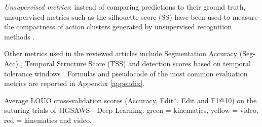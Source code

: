 \documentclass[journal]{IEEEtran}
\begin{document}
\textit{Unsupervised metrics}: instead of comparing predictions to their ground truth, unsupervised metrics such as the silhouette score (SS) have been used to measure the compactness of action clusters generated by unsupervised recognition methods \cite{Murali2016}. 

Other metrics used in the reviewed articles include Segmentation Accuracy (Seg-Acc) \cite{Zhao2018}, Temporal Structure Score (TSS) \cite{Goel2019} and detection scores based on temporal tolerance windows \cite{Fox2017, Tsai2019unsup}. Formulas and pseudocode of the most common evaluation metrics are reported in Appendix \ref{appendix}.




\begin{table*}[t!]
	\caption[Deep Learning.]{Average LOUO cross-validation scores (Accuracy, Edit*, Edit and F1@10) on the suturing trials of JIGSAWS - Deep Learning. green = kinematics, yellow = video, red = kinematics and video.}\label{tab2}
	\centering
	\footnotesize
	\renewcommand{\arraystretch}{1.47}
	\renewcommand{\arrayrulewidth}{1pt}
    	

\end{table*}
\end{document}
